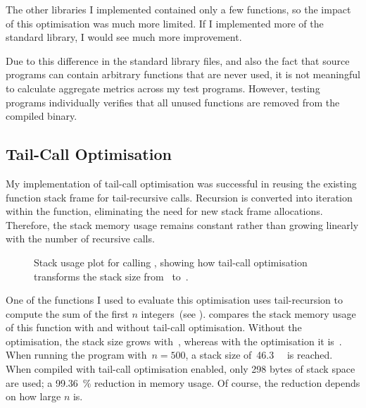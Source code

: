 \documentclass[00-main.tex]{subfiles}
\begin{document}
The other libraries I implemented contained only a few functions, so the impact of this optimisation was much more limited.
If I implemented more of the standard library, I would see much more improvement.

Due to this difference in the standard library files, and also the fact that source programs can contain arbitrary functions that are never used, it is not meaningful to calculate aggregate metrics across my test programs.
However, testing programs individually verifies that all unused functions are removed from the compiled binary.

\subsection{Tail-Call Optimisation}\label{sec:eval:tail-call optimisation}

My implementation of tail-call optimisation was successful in reusing the existing function stack frame for tail-recursive calls.
Recursion is converted into iteration within the function, eliminating the need for new stack frame allocations.
Therefore, the stack memory usage remains constant rather than growing linearly with the number of recursive calls.

\begin{figure}[!b]
  \centering
  \caption{
    Stack usage plot for calling , showing how tail-call optimisation transforms the stack size from~ to~.
  }
  \label{fig:tail-call optimisation stack use} %
\end{figure}

One of the functions I used to evaluate this optimisation uses tail-recursion to compute the sum of the first $n$ integers~(see ).
 compares the stack memory usage of this function with and without tail-call optimisation.
Without the optimisation, the stack size grows with~, whereas with the optimisation it is~.
When running the program with~$n=500$, a stack size of~\SI{46.3}{\kilo\byte} is reached.
When compiled with tail-call optimisation enabled, only 298 bytes of stack space are used; a \SI{99.36}{\percent} reduction in memory usage.
Of course, the reduction depends on how large $n$ is.
\end{document}

